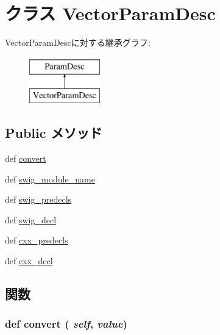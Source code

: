 \hypertarget{classm5_1_1params_1_1VectorParamDesc}{
\section{クラス VectorParamDesc}
\label{classm5_1_1params_1_1VectorParamDesc}
}
VectorParamDescに対する継承グラフ:\begin{figure}[H]
\begin{center}
\leavevmode
\includegraphics[height=2cm]{classm5_1_1params_1_1VectorParamDesc}
\end{center}
\end{figure}
\subsection*{Public メソッド}
\begin{DoxyCompactItemize}
\item 
def \hyperlink{classm5_1_1params_1_1VectorParamDesc_afe69e9190aa0b3889a9a5f63a42799f5}{convert}
\item 
def \hyperlink{classm5_1_1params_1_1VectorParamDesc_af01ddd9d6f03f6acd217b51e01a920bd}{swig\_\-module\_\-name}
\item 
def \hyperlink{classm5_1_1params_1_1VectorParamDesc_ab3dbcf5716623eac67a8ccc074fa7e13}{swig\_\-predecls}
\item 
def \hyperlink{classm5_1_1params_1_1VectorParamDesc_a83526365333b680bfcbd9b037527cc25}{swig\_\-decl}
\item 
def \hyperlink{classm5_1_1params_1_1VectorParamDesc_a0b408a11a14bd1d770e28f71a6e14ab5}{cxx\_\-predecls}
\item 
def \hyperlink{classm5_1_1params_1_1VectorParamDesc_a723cbb1dc9ae0e7f3d102c6678f181c0}{cxx\_\-decl}
\end{DoxyCompactItemize}


\subsection{関数}
\hypertarget{classm5_1_1params_1_1VectorParamDesc_afe69e9190aa0b3889a9a5f63a42799f5}{
\subsubsection[{convert}]{\setlength{\rightskip}{0pt plus 5cm}def convert ( {\em self}, \/   {\em value})}}
\label{classm5_1_1params_1_1VectorParamDesc_afe69e9190aa0b3889a9a5f63a42799f5}



